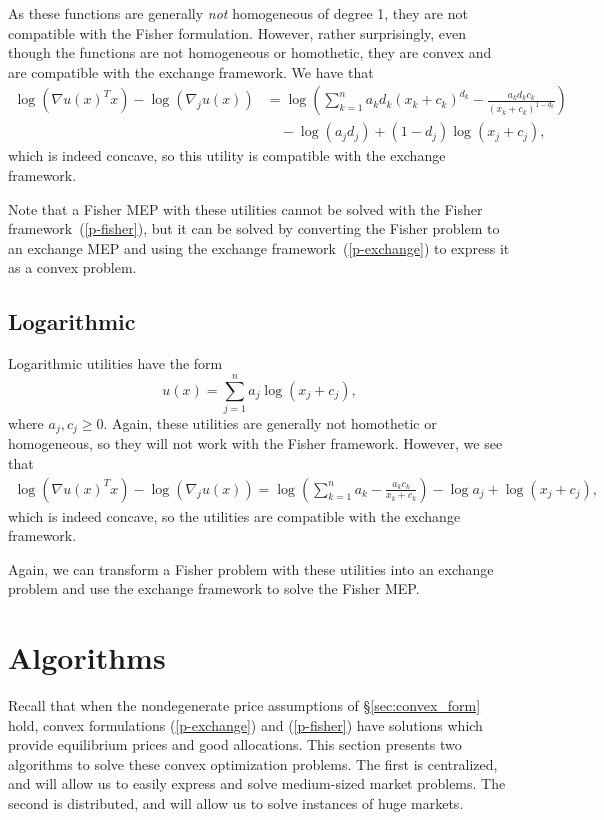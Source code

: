 \documentclass[12pt]{article}
\begin{document}
As these functions are generally \emph{not} homogeneous of degree 1,
they are not compatible with the Fisher formulation.
However, rather surprisingly, even though the
functions are not homogeneous or homothetic, they are
convex and are compatible with the exchange framework.
We have that
\begin{align*}
\log(\nabla u(x)^T x) - \log(\nabla_j u(x))
&= \log\left(\sum_{k=1}^n a_k d_k (x_k+c_k)^{d_k} - \frac{a_k d_k c_k}{(x_k + c_k)^{1-d_k}} \right)\\
&\quad- \log(a_j d_j) + (1-d_j)\log (x_j + c_j),
\end{align*}
which is indeed concave, so this utility is compatible with
the exchange framework.

Note that a Fisher MEP with these utilities cannot be solved with the Fisher
framework~(\ref{p-fisher}), but it can be solved by converting the Fisher
problem to an exchange MEP and using the exchange framework~(\ref{p-exchange})
to express it as a convex problem.


\subsection{Logarithmic}
Logarithmic utilities have the form
\[
u(x) = \sum_{j=1}^n a_j \log(x_j+ c_j),
\]
where $a_j, c_j \geq 0$.
Again, these utilities are generally not homothetic or
homogeneous, so they will not work with the Fisher framework.
However, we see that 
\begin{align*}
\log(\nabla u(x)^T x) - \log(\nabla_j u(x)) =
\log\left(\sum_{k=1}^n a_k - \frac{a_k c_k}{x_k+c_k} \right) - \log a_j + \log (x_j + c_j),
\end{align*}
which is indeed concave, so the utilities are compatible
with the exchange framework.

Again, we can transform a Fisher problem with these utilities into
an exchange problem and use the exchange framework to solve
the Fisher MEP.

\section{Algorithms}
\label{sec:algorithms}

Recall that when the nondegenerate price assumptions of \S\ref{sec:convex_form}
hold, convex formulations (\ref{p-exchange}) and (\ref{p-fisher}) have
solutions which provide equilibrium prices and good allocations. 
This section presents two algorithms to solve these convex optimization problems.
The first is
centralized, and will allow us to easily express and solve medium-sized market
problems. The second is distributed, and will allow us to solve
instances of huge markets.
\end{document}
